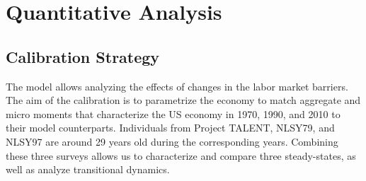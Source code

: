 \documentclass[onehalfspacing,11pt]{article}
\begin{document}
%
%
%
\section{Quantitative Analysis}\label{sec:quant}
\subsection{Calibration Strategy}\label{sec:calstrat}
The model allows analyzing the effects of changes in the labor market barriers. The aim of the calibration is to parametrize the economy to match aggregate and micro moments that characterize the US economy in 1970, 1990, and 2010 to their model counterparts. Individuals from Project TALENT, NLSY79, and NLSY97 are around 29 years old during the corresponding years. Combining these three surveys allows us to characterize and compare three steady-states, as well as analyze transitional dynamics.
\end{document}
